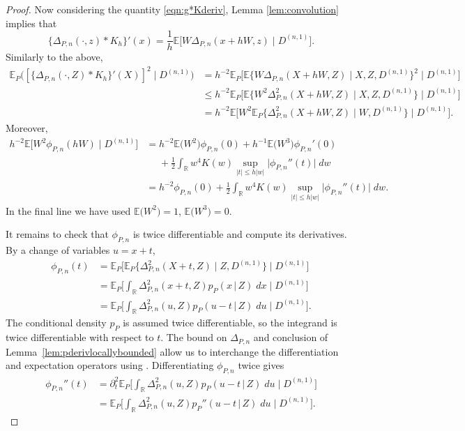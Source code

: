 \documentclass[aos]{imsart}
\newcommand{\R}{\mathbb{R}}
\newcommand{\E}{\mathbb{E}}
\newcommand{\given}{\,|\,}
\begin{document}
\begin{proof}
		Now considering the quantity \eqref{eqn:g*Kderiv}, Lemma \ref{lem:convolution} implies that \begin{equation*}
			\{\Delta_{P,n}(\cdot,z)*K_h\}'(x) = \frac1h \E\big[W\Delta_{P,n}(x+hW,z)\;\big|\; D^{(n,1)}\big].
		\end{equation*}
		Similarly to the above,
		\begin{align*}
			\E_P\big([\{\Delta_{P,n}(\cdot,Z)*K_h\}'(X)]^2\;\big|\; D^{(n,1)}\big) &= h^{-2}\E_P\big[\E\big\{W \Delta_{P,n}(X+hW,Z)\;\big|\; X,Z, D^{(n,1)}\}^2\;\big|\; D^{(n,1)}\big]\\
			&\leq h^{-2}\E_P\big[\E\big\{W^2 \Delta_{P,n}^2(X+hW,Z)\;\big|\; X,Z,D^{(n,1)} \big\}\;\big|\; D^{(n,1)}\big]\\
			&= h^{-2}\E\big[W^2 \E_P\big\{\Delta_{P,n}^2(X+hW,Z)\;\big|\; W, D^{(n,1)}\big\}\;\big|\; D^{(n,1)}\big].
		\end{align*}
		Moreover, 
		\begin{align}
			h^{-2}\E\big[W^2\phi_{P,n}(hW)\;\big|\; D^{(n,1)}\big] &= h^{-2} \E\big(W^2\big)\phi_{P,n}(0) + h^{-1}\E\big(W^3\big) \phi_{P,n}'(0) \nonumber\\
			&\phantom{=} +  \frac12 \int_\R w^4K(w) \sup_{|t|\leq h|w|} \big|\phi_{P,n}''(t)\big| \; dw \nonumber\\
			&= h^{-2}\phi_{P,n}(0) + \frac12 \int_\R w^4K(w) \sup_{|t|\leq h|w|} \big|\phi_{P,n}''(t)\big| \; dw. \label{eqn:w2phihwtaylor}
		\end{align}
		In the final line we have used $\E\big(W^2\big)=1$, $\E\big(W^3\big)=0$.
		
		It remains to check that $\phi_{P,n}$ is twice differentiable and compute its derivatives. By a change of variables $u=x + t$,
		\begin{align*}
			\phi_{P,n}(t) &= \E_P\Big[\E_P\big\{\Delta_{P,n}^2(X+t,Z) \;\big|\; Z, D^{(n,1)} \big\}\;\Big|\; D^{(n,1)}\Big]\\
			&= \E_P\bigg[\int_{\R} \Delta_{P,n}^2 (x+t,Z) p_P(x\given  Z) \; dx  \;\bigg|\; D^{(n,1)}\bigg]\\
			&= \E_P\bigg[\int_{\R} \Delta_{P,n}^2 (u,Z) p_P(u-t\given  Z) \; du\;\bigg|\; D^{(n,1)}\bigg].
		\end{align*}
		The conditional density $p_P$ is assumed twice differentiable, so the integrand is twice differentiable with respect to $t$. The bound on $\Delta_{P,n}$ and conclusion of Lemma~\ref{lem:pderivlocallybounded} allow us to interchange the differentiation and expectation operators using \citet[Thm.~20.4]{AliprantisAnalysis}. Differentiating $\phi_{P,n}$ twice gives \begin{align}
			\phi_{P,n}''(t) &= \partial_{t}^2\E_P\bigg[\int_{\R} \Delta_{P,n}^2 (u,Z) p_P(u-t\given  Z) \; du\;\bigg|\; D^{(n,1)}\bigg] \nonumber\\
			&= \E_P\bigg[ \int_{\R} \Delta_{P,n}^2 (u,Z) p_P''(u-t\given  Z) \; du\;\bigg|\; D^{(n,1)}\bigg].\label{eqn:phi''int}
		\end{align}
		

\end{proof}
\end{document}
